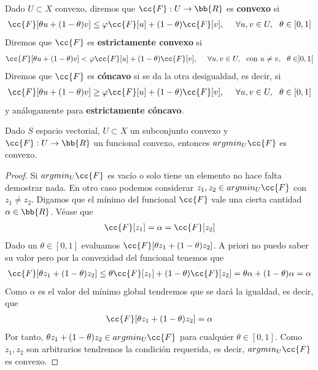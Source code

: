 \begin{definicion}
    Dado $U\subset X$ convexo, diremos que $\cc{F}:U\to \bb{R}$ es \textbf{convexo} si 
    \begin{gather*}
        \cc{F}[\theta u + (1-\theta)v] \leq \varphi \cc{F}[u] + (1-\theta)\cc{F}[v],\ \ \ \ \forall u,v\in U,\ \ \theta \in [0,1]
    \end{gather*}
    Diremos que $\cc{F}$ es \textbf{estrictamente convexo} si
    \begin{gather*}
        \cc{F}[\theta u + (1-\theta)v] < \varphi \cc{F}[u] + (1-\theta)\cc{F}[v],\ \ \ \ \forall u,v\in U,\ \text{ con } u\neq v,\ \ \theta \in ]0,1[
    \end{gather*}
    Diremos que $\cc{F}$ es \textbf{cóncavo} si se da la otra desigualdad, es decir, si
    \begin{gather*}
        \cc{F}[\theta u + (1-\theta)v] \geq \varphi \cc{F}[u] + (1-\theta)\cc{F}[v],\ \ \ \ \forall u,v\in U,\ \ \theta \in [0,1]
    \end{gather*}
    y análogamente para \textbf{estrictamente cóncavo}.
\end{definicion}

\begin{lema}
    Dado $S$ espacio vectorial, $U\subset X$ un subconjunto convexo y $\cc{F}:U\to \bb{R}$ un funcional convexo, entonces $argmin_U\cc{F}$ es convexo.

    \begin{proof}
        Si $argmin_U \cc{F}$ es vacío o solo tiene un elemento no hace falta demostrar nada. En otro caso podemos considerar $z_1,z_2\in argmin_U\cc{F}$ con $z_1\neq z_2$. Digamos que el mínimo del funcional $\cc{F}$ vale una cierta cantidad $\alpha\in \bb{R}$. Véase que
        \begin{gather*}
            \cc{F}[z_1] = \alpha = \cc{F}[z_2]
        \end{gather*}
        Dado un $\theta \in [0,1]$ evaluamos $\cc{F}[\theta z_1 + (1-\theta)z_2]$. A priori no puedo saber su valor pero por la convexidad del funcional tenemos que
        \begin{gather*}
            \cc{F}[\theta z_1 + (1-\theta)z_2] \leq \theta \cc{F}[z_1] + (1-\theta)\cc{F}[z_2] = \theta \alpha + (1-\theta) \alpha = \alpha
        \end{gather*} 
        Como $\alpha$ es el valor del mínimo global tendremos que se dará la igualdad, es decir, que 
        \begin{gather*}
            \cc{F}[\theta z_1 + (1-\theta)z_2] = \alpha
        \end{gather*} 
        Por tanto, $\theta z_1 + (1-\theta) z_2 \in argmin_U \cc{F}$ para cualquier $\theta \in [0,1]$. Como $z_1, z_2$ son arbitrarios tendremos la condición requerida, es decir, $argmin_U \cc{F}$ es convexo.
    \end{proof} 
\end{lema}

